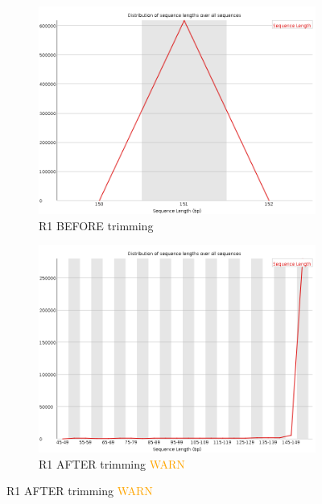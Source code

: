 \documentclass{article}
\begin{document}
\begin{figure}[!htb]
\caption{Sequence Length Distribution}
\centering
\begin{subfigure}{0.45\linewidth}
\includegraphics[width=\linewidth]{04-D15-22373-HT-Nextera-Myeloid-Val1-Repeat_S4_L001_R1_001_fastqc/Images/sequence_length_distribution.png}
\caption{R1 BEFORE trimming}
\end{subfigure}
\begin{subfigure}{0.45\linewidth}
\includegraphics[width=\linewidth]{04-D15-22373-HT-Nextera-Myeloid-Val1-Repeat_S4_L001_R1_001.qfilter_fastqc/Images/sequence_length_distribution.png}
\caption{R1 AFTER trimming \textcolor{orange}{WARN}}
\end{subfigure}

\end{figure}
\end{document}
